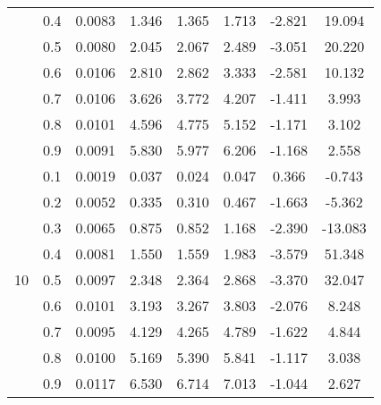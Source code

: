 \documentclass[11pt,a4paper]{report}
\begin{document}
\begin{longtable}{ | c | c || c | c | c | c | c | c | }
 & 0.4 & 0.0083 & 1.346 & 1.365 & 1.713 & -2.821 & 19.094 \\
 & 0.5 & 0.0080 & 2.045 & 2.067 & 2.489 & -3.051 & 20.220 \\
 & 0.6 & 0.0106 & 2.810 & 2.862 & 3.333 & -2.581 & 10.132 \\
 & 0.7 & 0.0106 & 3.626 & 3.772 & 4.207 & -1.411 & 3.993 \\
 & 0.8 & 0.0101 & 4.596 & 4.775 & 5.152 & -1.171 & 3.102 \\
 & 0.9 & 0.0091 & 5.830 & 5.977 & 6.206 & -1.168 & 2.558 \\
 \hline
\multirow{9}{*}{10} & 0.1 & 0.0019 & 0.037 & 0.024 & 0.047 & 0.366 & -0.743 \\
 & 0.2 & 0.0052 & 0.335 & 0.310 & 0.467 & -1.663 & -5.362 \\
 & 0.3 & 0.0065 & 0.875 & 0.852 & 1.168 & -2.390 & -13.083 \\
 & 0.4 & 0.0081 & 1.550 & 1.559 & 1.983 & -3.579 & 51.348 \\
 & 0.5 & 0.0097 & 2.348 & 2.364 & 2.868 & -3.370 & 32.047 \\
 & 0.6 & 0.0101 & 3.193 & 3.267 & 3.803 & -2.076 & 8.248 \\
 & 0.7 & 0.0095 & 4.129 & 4.265 & 4.789 & -1.622 & 4.844 \\
 & 0.8 & 0.0100 & 5.169 & 5.390 & 5.841 & -1.117 & 3.038 \\
 & 0.9 & 0.0117 & 6.530 & 6.714 & 7.013 & -1.044 & 2.627 \\
 \hline
\hline
\end{longtable}
\end{document}
